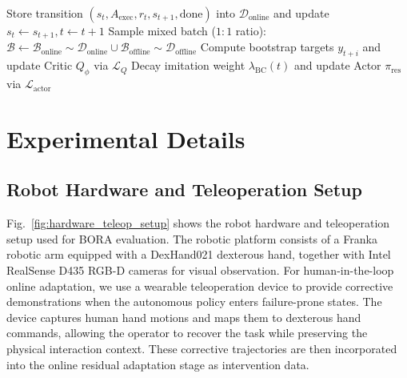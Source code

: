 \documentclass{article}
\begin{document}
\begin{algorithm*}[htbp]
\begin{algorithmic}[1]
        \State Store transition $(s_t, A_{\text{exec}}, r_t, s_{t+1}, \text{done})$ into $\mathcal{D}_{\text{online}}$ and update $s_t \gets s_{t+1}, t \gets t + 1$
            \State Sample mixed batch ($1:1$ ratio): $\mathcal{B} \gets \mathcal{B}_{\text{online}} \sim \mathcal{D}_{\text{online}} \cup \mathcal{B}_{\text{offline}} \sim \mathcal{D}_{\text{offline}}$
            \State Compute bootstrap targets $y_{t+i}$ and update Critic $Q_\phi$ via $\mathcal{L}_Q$
            \State Decay imitation weight $\lambda_{\text{BC}}(t)$ and update Actor $\pi_{\text{res}}$ via $\mathcal{L}_{\text{actor}}$
        \EndIf
    \EndWhile
\EndFor
\end{algorithmic}
\end{algorithm*}


\clearpage
\section{Experimental Details}
\label{sec:experimental_details}
\subsection{Robot Hardware and Teleoperation Setup}

Fig.~\ref{fig:hardware_teleop_setup} shows the robot hardware and teleoperation setup used for BORA evaluation.
The robotic platform consists of a Franka robotic arm equipped with a DexHand021 dexterous hand, together with Intel RealSense D435 RGB-D cameras for visual observation.
For human-in-the-loop online adaptation, we use a wearable teleoperation device to provide corrective demonstrations when the autonomous policy enters failure-prone states.
The device captures human hand motions and maps them to dexterous hand commands, allowing the operator to recover the task while preserving the physical interaction context.
These corrective trajectories are then incorporated into the online residual adaptation stage as intervention data.
\end{document}
